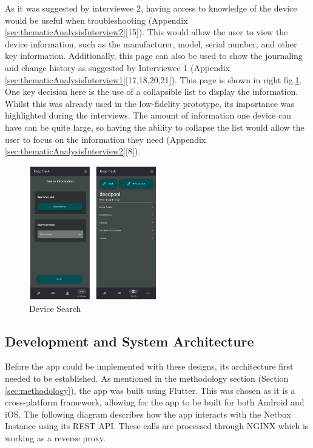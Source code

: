 \documentclass [11pt,a4paper]{article}
\begin{document}
As it was suggested by interviewee 2, having access to knowledge of the device would be useful when troubleshooting (Appendix \ref{sec:thematicAnalysisInterview2}[15]). This would allow the user to view the device information, such as the manufacturer, model, serial number, and other key information. Additionally, this page can also be used to show the journaling and change history as suggested by Interviewee 1 (Appendix \ref{sec:thematicAnalysisInterview1}[17,18,20,21]). This page is shown in right fig.\ref{fig:device_search}. One key decision here is the use of a collapsible list to display the information. Whilst this was already used in the low-fidelity prototype, its importance was highlighted during the interviews. The amount of information one device can have can be quite large, so having the ability to collapse the list would allow the user to focus on the information they need (Appendix \ref{sec:thematicAnalysisInterview2}[8]). 

\begin{figure}[H]
    \centering
    \includegraphics[width=0.5\textwidth]{images/device_info.png}
    \caption{Device Search}
    \label{fig:device_search}
\end{figure}

\subsection{Development and System Architecture}
\label{sec:development} 
Before the app could be implemented with these designs, its architecture first needed to be established. As mentioned in the methodology section (Section \ref{sec:methodology}), the app was built using Flutter. This was chosen as it is a cross-platform framework, allowing for the app to be built for both Android and iOS. The following diagram describes how the app interacts with the Netbox Instance using its REST API. These calls are processed through NGINX which is working as a reverse proxy.
\end{document}
